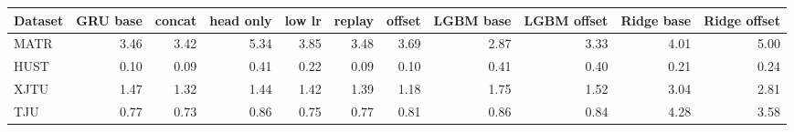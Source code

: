\begin{tabular}{lrrrrrrrrrr}
\toprule
Dataset & GRU base & concat & head only & low lr & replay & offset & LGBM base & LGBM offset & Ridge base & Ridge offset \\
\midrule
MATR & 3.46 & 3.42 & 5.34 & 3.85 & 3.48 & 3.69 & 2.87 & 3.33 & 4.01 & 5.00 \\
HUST & 0.10 & 0.09 & 0.41 & 0.22 & 0.09 & 0.10 & 0.41 & 0.40 & 0.21 & 0.24 \\
XJTU & 1.47 & 1.32 & 1.44 & 1.42 & 1.39 & 1.18 & 1.75 & 1.52 & 3.04 & 2.81 \\
TJU & 0.77 & 0.73 & 0.86 & 0.75 & 0.77 & 0.81 & 0.86 & 0.84 & 4.28 & 3.58 \\
\bottomrule
\end{tabular}
